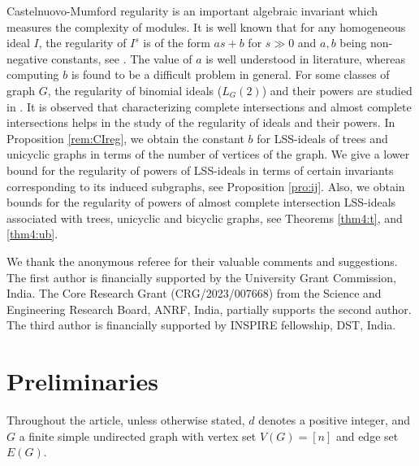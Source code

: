 \documentclass[11pt,a4paper,reqno]{amsart}
\theoremstyle{definition}
\numberwithin{equation}{section}
\begin{document}
\vspace{2mm} 
 
Castelnuovo-Mumford regularity is an important algebraic invariant which measures the complexity of modules. 
It is well known that for any homogeneous ideal $I$, the regularity of $I^s$ is of the form $as+b$ for $s \gg 0$ and $a,b$ being non-negative constants, see \cite{CHT1999, V2000}. The value of $a$ is well understood in literature, whereas computing $b$ is found to be a difficult problem in general. For some classes of graph $G$, the regularity of binomial ideals ($L_G(2)$) and their powers are studied in \cite{AN,ANcycle,VRT2021,JAR2019,A2021reg,MM,SZ}. It is observed that characterizing complete intersections and almost complete intersections helps in the study of the regularity of ideals and their powers.  
 In Proposition \ref{rem:CIreg}, we obtain the constant $b$ for LSS-ideals of trees and unicyclic graphs in terms of the number of vertices of the graph.  
We give a lower bound for the regularity of powers of LSS-ideals in terms of certain invariants corresponding to its induced subgraphs, see Proposition \ref{pro:ij}. Also, we obtain bounds for the regularity of powers of almost complete intersection LSS-ideals associated with trees, unicyclic and bicyclic graphs, see Theorems \ref{thm4:t}, and \ref{thm4:ub}. %





\vspace{4mm}

  We thank the anonymous referee for their valuable comments and suggestions. The first author is financially supported by the University Grant Commission, India. The Core Research Grant (CRG/2023/007668) from the Science and Engineering Research Board, ANRF, India, partially supports the second author. The third author is financially supported by INSPIRE fellowship, DST, India.

\section{Preliminaries} \label{section 1}
Throughout the article, unless otherwise stated, $d$ denotes a positive integer, and $G$ a finite simple undirected graph with vertex set $V(G)=[n]$ and edge set $E(G)$.
\end{document}
